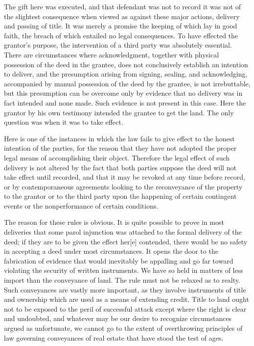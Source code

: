 The gift here was executed, and that defendant was not to record it was not of
the slightest consequence when viewed as against these major actions, delivery
and passing of title. It was merely a promise the keeping of which lay in good
faith, the breach of which entailed no legal consequences. To have effected the
grantor's purpose, the intervention of a third party was absolutely essential.
There are circumstances where acknowledgment, together with physical possession
of the deed in the grantee, does not conclusively establish an intention to
deliver, and the presumption arising from signing, sealing, and acknowledging,
accompanied by manual possession of the deed by the grantee, is not
irrebuttable, but this presumption can be overcome only by evidence that no
delivery was in fact intended and none made. Such evidence is not present in
this case. Here the grantor by his own testimony intended the grantee to get
the land. The only question was when it was to take effect.

Here is one of the instances in which the law fails to give effect to the honest
intention of the parties, for the reason that they have not adopted the proper
legal means of accomplishing their object. Therefore the legal effect of such
delivery is not altered by the fact that both parties suppose the deed will not
take effect until recorded, and that it may be revoked at any time before
record, or by contemporaneous agreements looking to the reconveyance of the
property to the grantor or to the third party upon the happening of certain
contingent events or the nonperformance of certain conditions.

The reason for these rules is obvious. It is quite possible to prove in most
deliveries that some parol injunction was attached to the formal delivery of
the deed; if they are to be given the effect her[e] contended, there would be
no safety in accepting a deed under most circumstances. It opens the door to
the fabrication of evidence that would inevitably be appalling and go far
toward violating the security of written instruments. We have so held in
matters of less import than the conveyance of land. The rule must not be
relaxed as to realty. Such conveyances are vastly more important, as they
involve instruments of title and ownership which are used as a means of
extending credit. Title to land ought not to be exposed to the peril of
successful attack except where the right is clear and undoubted, and whatever
may be our desire to recognize circumstances argued as unfortunate, we cannot
go to the extent of overthrowing principles of law governing conveyances of
real estate that have stood the test of ages.

